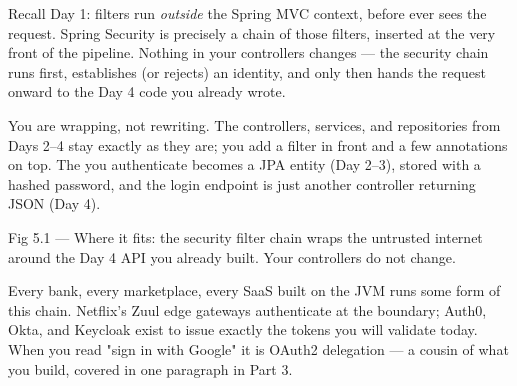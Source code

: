  Recall Day 1: filters run \emph{outside} the Spring MVC context, before  ever sees the request. Spring Security is precisely a chain of those filters, inserted at the very front of the pipeline. Nothing in your controllers changes --- the security chain runs first, establishes (or rejects) an identity, and only then hands the request onward to the Day 4 code you already wrote.

 You are wrapping, not rewriting. The controllers, services, and repositories from Days 2--4 stay exactly as they are; you add a filter in front and a few annotations on top. The  you authenticate becomes a JPA entity (Day 2--3), stored with a hashed password, and the login endpoint is just another controller returning JSON (Day 4).

\begin{wbfigure}{Fig 5.1 — Where it fits: the security filter chain wraps the untrusted internet around the Day 4 API you already built. Your controllers do not change.}
\end{wbfigure}

 Every bank, every marketplace, every SaaS built on the JVM runs some form of this chain. Netflix's Zuul edge gateways authenticate at the boundary; Auth0, Okta, and Keycloak exist to issue exactly the tokens you will validate today. When you read "sign in with Google" it is OAuth2 delegation --- a cousin of what you build, covered in one paragraph in Part 3.


